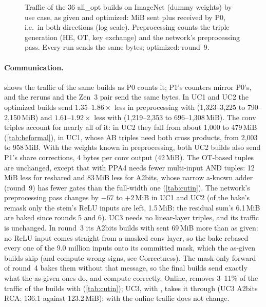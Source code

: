 \begin{figure}[t]
  \centering
  \caption{Traffic of the 36 all\_opt builds on ImageNet (dummy weights) by use case, as given and optimized: MiB sent plus
  received by P0, i.e.\ in both directions (log scale). Preprocessing counts the triple generation (HE, OT, key
  exchange) and the network's preprocessing pass. Every run sends the same bytes; optimized: round~9.}
  \label{fig:triadcomm}
\end{figure}

\paragraph{Communication.}  shows the traffic of the same builds as P0 counts it; P1's counters
mirror P0's, and the reruns and the Zen~3 pair send the same bytes. In UC1 and UC2 the optimized builds send
$1.35$--$1.86\times$ less in preprocessing with  (1,323--3,225 to 790--2,150\,MiB) and
$1.61$--$1.92\times$ less with  (1,219--2,353 to 696--1,308\,MiB). The conv triples account for
nearly all of it: in UC2 they fall from about 1,000 to 479\,MiB (\cref{tab:heformal}), in UC1, whose AB triples need
both cross products, from 2,003 to 958\,MiB. With the weights known in preprocessing, both UC2 builds also send P1's
share corrections, 4 bytes per conv output (42\,MiB). The OT-based tuples are unchanged, except that with
 PPA4 needs fewer multi-input AND tuples: 12\,MiB less for reshared and 83\,MiB less
for A2bits, whose narrow a-known adder (round~9) has fewer gates than the full-width one (\cref{tab:cutin}). The network's preprocessing pass changes by
$-67$ to $+2$\,MiB in UC1 and UC2 (of the bake's remask only the stem's ReLU inputs are left, 1.5\,MiB: the residual
sum's 6.1\,MiB are baked since rounds 5 and 6). UC3 needs no linear-layer triples, and its traffic is unchanged. In round~3 its A2bits
builds with  sent 69\,MiB more than as given: no ReLU input comes straight from a masked conv layer,
so the bake rebased every one of the 9.0 million inputs onto its committed mask, which the as-given builds skip (and
compute wrong signs, see Correctness). The mask-only forward of round~4 bakes them without that message, so the
final builds send exactly what the as-given ones do, and compute correctly. Online,  removes 3--11\% of the traffic of the
builds with  (\cref{tab:cutin}); UC3, with , takes it through
 (UC3 A2bits RCA: 136.1 against 123.2\,MiB); with  the online traffic does not
change.

